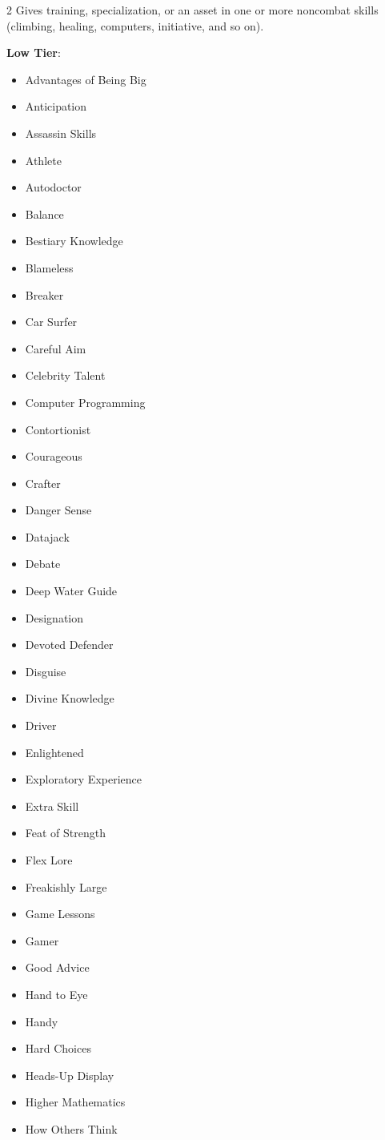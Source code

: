 \begin{multicols}{2}
Gives training, specialization, or an asset in one or more noncombat skills (climbing, healing, computers, initiative, and so on).

\textbf{Low Tier}:

\begin{itemize}
\item Advantages of Being Big
\item Anticipation
\item Assassin Skills
\item Athlete
\item Autodoctor
\item Balance
\item Bestiary Knowledge
\item Blameless
\item Breaker
\item Car Surfer
\item Careful Aim
\item Celebrity Talent
\item Computer Programming
\item Contortionist
\item Courageous
\item Crafter
\item Danger Sense
\item Datajack
\item Debate
\item Deep Water Guide
\item Designation
\item Devoted Defender
\item Disguise
\item Divine Knowledge
\item Driver
\item Enlightened
\item Exploratory Experience
\item Extra Skill
\item Feat of Strength
\item Flex Lore
\item Freakishly Large
\item Game Lessons
\item Gamer
\item Good Advice
\item Hand to Eye
\item Handy
\item Hard Choices
\item Heads-Up Display
\item Higher Mathematics
\item How Others Think

\end{itemize}
\end{multicols}
